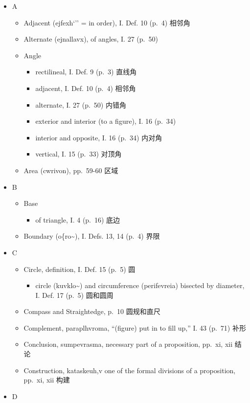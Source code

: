 \documentclass[
]{book}
\providecommand{\tightlist}{%
  \setlength{\itemsep}{0pt}\setlength{\parskip}{0pt}}
\begin{document}
\begin{itemize}
\tightlist
\item
  A

  \begin{itemize}
  \tightlist
  \item
    Adjacent (ejfexh`'' = in order), I. Def. 10 (p.~4) 相邻角
  \item
    Alternate (ejnallavx), of angles, I. 27 (p.~50)\\
  \item
    Angle

    \begin{itemize}
    \tightlist
    \item
      rectilineal, I. Def. 9 (p.~3) 直线角
    \item
      adjacent, I. Def. 10 (p.~4) 相邻角
    \item
      alternate, I. 27 (p.~50) 内错角
    \item
      exterior and interior (to a figure), I. 16 (p.~34)\\
    \item
      interior and opposite, I. 16 (p.~34) 内对角
    \item
      vertical, I. 15 (p.~33) 对顶角
    \end{itemize}
  \item
    Area (cwrivon), pp.~59-60 区域
  \end{itemize}
\item
  B

  \begin{itemize}
  \tightlist
  \item
    Base

    \begin{itemize}
    \tightlist
    \item
      of triangle, I. 4 (p.~16) 底边
    \end{itemize}
  \item
    Boundary (o\{ro\textasciitilde), I. Defs. 13, 14 (p.~4) 界限
  \end{itemize}
\item
  C

  \begin{itemize}
  \tightlist
  \item
    Circle, definition, I. Def. 15 (p.~5) 圆

    \begin{itemize}
    \tightlist
    \item
      circle (kuvklo\textasciitilde) and circumference (perifevreia) bisected by diameter, I. Def. 17 (p.~5) 圆和圆周
    \end{itemize}
  \item
    Compass and Straightedge, p.~10 圆规和直尺
  \item
    Complement, paraplhvroma, ``(figure) put in to fill up,'' I. 43 (p.~71) 补形
  \item
    Conclusion, sumpevrasma, necessary part of a proposition, pp.~xi, xii 结论
  \item
    Construction, kataskeuh,v one of the formal divisions of a proposition, pp.~xi, xii 构建
  \end{itemize}
\item
  D


\end{itemize}
\end{document}
